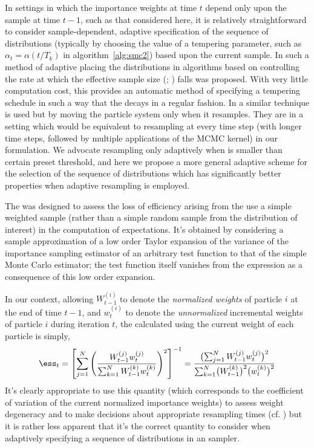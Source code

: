 In settings in which the importance weights at time $t$ depend only upon the
sample at time $t-1$, such as that considered here, it is relatively
straightforward to consider sample-dependent, adaptive specification of the
sequence of distributions (typically by choosing the value of a tempering
parameter, such as $\alpha_t = \alpha(t/T_k)$ in algorithm~\ref{alg:smc2})
based upon the current sample. In \cite{Jasra:2010eh} such a method of
adaptive placing the distributions in \smc algorithms based on controlling the
rate at which the effective sample size (\ess; \cite{Kong:1994ul}) falls was
proposed. With very little computation cost, this provides an automatic method
of specifying a tempering schedule in such a way that the \ess decays in a
regular fashion. In \cite[Algorithm 2]{Schafer:2011bx} a similar technique is
used but by moving the particle system only when it resamples. They are in a
setting which would be equivalent to resampling at every time step (with
longer time steps, followed by multiple applications of the MCMC kernel) in
our formulation. We advocate resampling only adaptively when \ess is smaller
than certain preset threshold, and here we propose a more general adaptive
scheme for the selection of the sequence of distributions which has
significantly better properties when adaptive resampling is employed.

The \ess was designed to assess the loss of efficiency arising from the use a
simple weighted sample (rather than a simple random sample from the
distribution of interest) in the computation of expectations. It's obtained by
considering a sample approximation of a low order Taylor expansion of the
variance of the importance sampling estimator of an arbitrary test function to
that of the simple Monte Carlo estimator; the test function itself vanishes
from the expression as a consequence of this low order expansion.

In our context, allowing $W_{t-1}^{(i)}$ to denote the \emph{normalized
  weights} of particle $i$ at the end of time $t - 1$, and $w_t^{(i)}$ to
denote the \emph{unnormalized} incremental weights of particle $i$ during
iteration $t$, the \ess calculated using the current weight of each particle
is simply,
\begin{equation}
  \ess_t = \left[ {\sum_{j=1}^N\left( \frac{W_{t-1}^{(j)}
          w_t^{(j)}}{\sum_{k=1}^NW_{t-1}^{(k)}w_t^{(k)}}\right)^2}
  \right]^{-1} = \frac{\bigl(\sum_{j=1}^NW_{t-1}^{(j)}w_t^{(j)}\bigr)^2}
  {\sum_{k=1}^N\bigl(W_{t-1}^{(k)}\bigr)^2\bigl(w_t^{(k)}\bigr)^2}
\end{equation}
It's clearly appropriate to use this quantity (which corresponds to the
coefficient of variation of the current normalized importance weights) to
assess weight degeneracy and to make decisions about appropriate resampling
times (cf. \cite{DelMoral:2012jq}) but it is rather less apparent that it's
the correct quantity to consider when adaptively specifying a sequence of
distributions in an \smc sampler.

